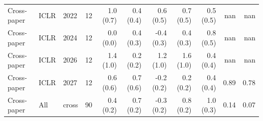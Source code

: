\begin{tabular}{lllrrrrrrrr}
Cross-paper & ICLR & 2022 & 12 & 1.0 (0.7) & 0.4 (0.4) & 0.6 (0.5) & 0.7 (0.5) & 0.5 (0.5) & nan & nan \\
Cross-paper & ICLR & 2024 & 12 & 0.0 (0.0) & 0.4 (0.3) & -0.4 (0.3) & 0.4 (0.3) & 0.8 (0.5) & nan & nan \\
Cross-paper & ICLR & 2026 & 12 & 1.4 (1.0) & 0.2 (0.2) & 1.2 (1.0) & 1.6 (1.0) & 0.4 (0.4) & nan & nan \\
Cross-paper & ICLR & 2027 & 12 & 0.6 (0.6) & 0.7 (0.6) & -0.2 (0.2) & 0.2 (0.2) & 0.4 (0.4) & 0.89 & 0.78 \\
Cross-paper & All & cross & 90 & 0.4 (0.2) & 0.7 (0.2) & -0.3 (0.2) & 0.8 (0.2) & 1.0 (0.3) & 0.14 & 0.07 \\
\bottomrule
\end{tabular}
